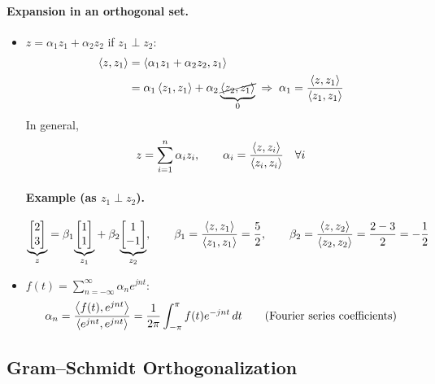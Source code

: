 \paragraph{Expansion in an orthogonal set.}
\begin{itemize}
\item $z = \alpha_1 z_1 + \alpha_2 z_2$ \quad if $z_1\perp z_2$:
\begin{align*}
\left\langle z, z_1 \right\rangle &= \left\langle \alpha_1 z_1 + \alpha_2 z_2, z_1 \right\rangle\\
&= \alpha_1\left\langle z_1, z_1 \right\rangle + \alpha_2\underbrace{\cancel{\left\langle z_2, z_1 \right\rangle}}_{0} \;\Rightarrow\; \alpha_1 = \frac{\left\langle z, z_1 \right\rangle}{\left\langle z_1, z_1 \right\rangle}
\end{align*}
In general,
\[
z = \sum_{i=1}^n \alpha_i z_i, \qquad \alpha_i = \frac{\left\langle z, z_i \right\rangle}{\left\langle z_i, z_i \right\rangle} \quad \forall i
\]
\paragraph{Example (as $z_1\perp z_2$).}
\[
{\underbrace{\begin{bmatrix}2\\ 3\end{bmatrix}}_{z}} = \beta_1{\underbrace{\begin{bmatrix}1\\ 1\end{bmatrix}}_{z_1}} + \beta_2{\underbrace{\begin{bmatrix}1\\ -1\end{bmatrix}}_{z_2}},
\qquad
\beta_1 = \frac{\left\langle z, z_1 \right\rangle}{\left\langle z_1, z_1 \right\rangle} = \frac{5}{2},
\qquad
\beta_2 = \frac{\left\langle z, z_2 \right\rangle}{\left\langle z_2, z_2 \right\rangle} = \frac{2-3}{2} = -\frac12
\]
\item $f(t) = \sum_{n=-\infty}^{\infty}\alpha_n e^{jnt}$:
\[
\alpha_n = \frac{\left\langle f(t), e^{jnt} \right\rangle}{\left\langle e^{jnt}, e^{jnt} \right\rangle} = \frac{1}{2\pi}\int_{-\pi}^{\pi} f(t)e^{-jnt}\,dt \qquad \text{(Fourier series coefficients)}
\]
\end{itemize}

\subsection{Gram--Schmidt Orthogonalization}\label{ss:gram-schmidt}
%
